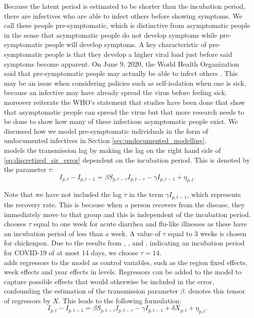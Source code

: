 \documentclass[12pt]{article}
\begin{document}
	Because the latent period is estimated to be shorter than the incubation period, there are infectives who are able to infect others before showing symptoms. We call these people pre-symptomatic, which is distinctive from asymptomatic people in the sense that asymptomatic people do not develop symptoms while pre-symptomatic people will develop symptoms. A key characteristic of pre-symptomatic people is that they develop a higher viral load just before said symptoms become apparent. On June 9, 2020, the World Health Organization said that pre-symptomatic people may actually be able to infect others \parencite{bloomberg2020AsymptomaticSpread}. This may be an issue when considering policies such as self-isolation when one is sick, because an infective may have already spread the virus before feeling sick. \textcite{bloomberg2020AsymptomaticSpread} moreover reiterate the WHO's statement that studies have been done that show that asymptomatic people can spread the virus but that more research needs to be done to show how many of these infectious asymptomatic people exist. We discussed how we model pre-symptomatic individuals in the form of undocumented infectives in Section \ref{sec:undocumented_modelling}. \\
	
	\textcite{adda2016economic} models the transmission lag by making the lag on the right hand side of \eqref{eq:discretized_sir_error} dependent on the incubation period. This is denoted by the parameter $\tau$:
	    \begin{equation}\label{eq:discretized_sir_tau}
	        I_{p,t} - I_{p,t-1} = \beta S_{p,t-\tau}I_{p,t-\tau} - \gamma I_{p,t-1} + \eta_{p,t}.
	    \end{equation}
	
	Note that we have not included the lag $\tau$ in the term $\gamma I_{p,t-1}$, which represents the recovery rate. This is because when a person recovers from the disease, they immediately move to that group and this is independent of the incubation period. \textcite{adda2016economic} chooses $\tau$ equal to one week for acute diarrhea and flu-like illnesses as these have an incubation period of less than a week. A value of $\tau$ equal to 3 weeks is chosen for chickenpox. Due to the results from \textcite{lauer2020incubation}, \textcite{li2020incubation}, and \textcite{linton2020incubation}, indicating an incubation period for COVID-19 of at most 14 days, we choose $\tau = 14$. \\
	
	\textcite{adda2016economic} adds regressors to the model as control variables, such as the region fixed effects, week effects and year effects in levels. Regressors can be added to the model to capture possible effects that would otherwise be included in the error, confounding the estimation of the transmission parameter $\beta$. \textcite{adda2016economic} denotes this tensor of regressors by $X$. This leads to the following formulation:
	    \begin{equation}\label{eq:discretized_sir_regressors}
        	I_{p,t} - I_{p,t-1} = \beta S_{p,t-\tau}I_{p,t-\tau} - \gamma I_{p,t-1} + \delta X_{p,t} + \eta_{p,t}.
    	\end{equation}
    	
\end{document}
